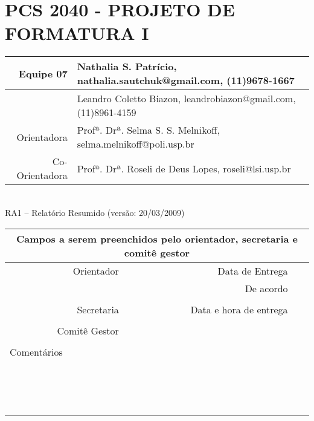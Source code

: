 \documentclass[a4paper,12pt,font=plain,header=plain]{abnt}
\begin{document}
  \setcounter{secnumdepth}{-1}
  \capa

  \renewenvironment{center}{}{}
  \section{PCS 2040 - PROJETO DE FORMATURA I}

    \begin{tabular}[|l|]{ |r|l| }
    \hline
			Equipe 07 & Nathalia S. Patrício, nathalia.sautchuk@gmail.com, (11)9678-1667 \\
		\hline
			& Leandro Coletto Biazon, leandrobiazon@gmail.com, (11)8961-4159 \\
		\hline
			Orientadora & Profª. Drª. Selma S. S. Melnikoff, selma.melnikoff@poli.usp.br \\
		\hline
			Co-Orientadora & Profª. Drª. Roseli de Deus Lopes, roseli@lsi.usp.br \\
		\hline
		\end{tabular} \\

		RA1 – Relatório Resumido (versão: 20/03/2009) \\

		\begin{tabular}{ |r|r|r| }

		\hline
			\multicolumn{3}{|c|}{Campos a serem preenchidos pelo orientador, secretaria e comitê gestor} \\
		\hline
			Orientador & Data de Entrega &  \\
		\hline
			& De acordo &  \\
		\hline
			& &  \\
		\hline
			Secretaria & Data e hora de entrega &  \\
		\hline
			&  &  \\
		\hline
			Comitê Gestor &  &  \\
		\hline
			&  &  \\
		\hline
			\multicolumn{3}{|l|}{Comentários} \\
			\multicolumn{3}{|l|}{} \\
			\multicolumn{3}{|l|}{} \\
			\multicolumn{3}{|l|}{} \\
			\multicolumn{3}{|l|}{} \\
			\multicolumn{3}{|l|}{} \\
			\multicolumn{3}{|l|}{} \\
			\multicolumn{3}{|l|}{} \\
			\multicolumn{3}{|l|}{} \\
			\multicolumn{3}{|l|}{} \\
			\multicolumn{3}{|l|}{} \\
			\multicolumn{3}{|l|}{} \\
			\multicolumn{3}{|l|}{} \\
			\multicolumn{3}{|l|}{} \\
			\multicolumn{3}{|l|}{} \\
			\multicolumn{3}{|l|}{} \\
		\hline
		\end{tabular}
\end{document}
